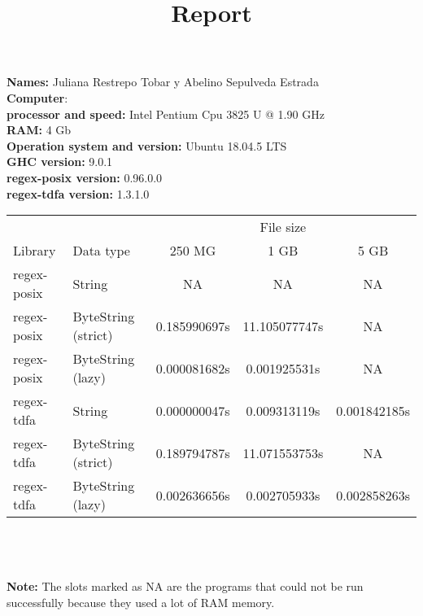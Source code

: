 \documentclass{article}
\title{Report}
\begin{document}
\maketitle

\indent \textbf{Names:} Juliana Restrepo Tobar y Abelino Sepulveda Estrada \\
\indent \textbf{Computer}: \\
\indent \indent \textbf{processor and speed:} Intel Pentium Cpu 3825 U @ 1.90 GHz \\
\indent \indent \textbf{RAM:} 4 Gb \\
\indent \textbf{Operation system and version:}  Ubuntu 18.04.5 LTS\\
\indent \textbf{GHC version:} 9.0.1\\
\indent \textbf{regex-posix version:} 0.96.0.0 \\
\indent \textbf{regex-tdfa version:} 1.3.1.0 \\


 \begin{tabular}{l l c c c}
 & & & File size \\
Library & Data type & 250 MG & 1 GB & 5 GB\\
\midrule
regex-posix & String & NA & NA & NA\\
regex-posix & ByteString (strict) & 0.185990697s & 11.105077747s & NA\\ \addlinespace
regex-posix & ByteString (lazy) & 0.000081682s & 0.001925531s & NA\\
regex-tdfa & String & 0.000000047s &  0.009313119s & 0.001842185s\\ \addlinespace
regex-tdfa & ByteString (strict) & 0.189794787s &  11.071553753s & NA\\
regex-tdfa & ByteString (lazy)& 0.002636656s & 0.002705933s & 0.002858263s\\
\bottomrule
\end{tabular}   
\\
\\
\\
\textbf{Note:} The slots marked as NA are the programs that could not be run successfully because they used a lot of RAM memory.
\end{document}
